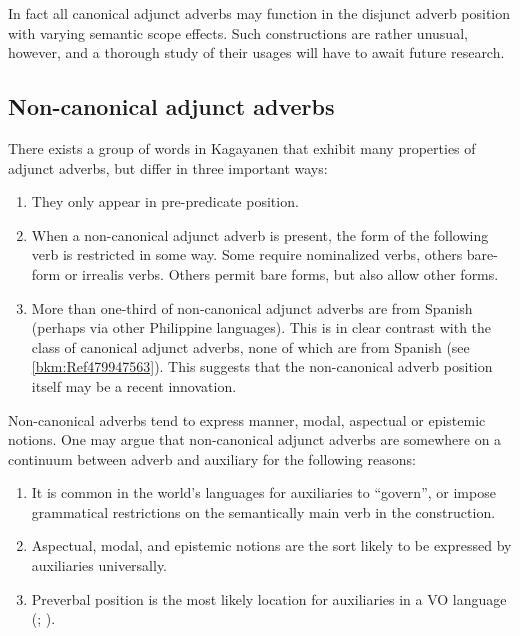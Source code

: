 In fact all canonical adjunct adverbs may function in the disjunct adverb position with varying semantic scope effects. Such constructions are rather unusual, however, and a thorough study of their usages will have to await future research.

\subsection{Non-canonical adjunct adverbs}
\label{bkm:Ref480610640} \label{sec:non-canonicaladjunctadverbs}

There exists a group of words in Kagayanen that exhibit many properties of adjunct adverbs, but differ in three important ways:

\begin{enumerate}
\item They only appear in pre-predicate position.
\item  When a non-canonical adjunct adverb is present, the form of the following verb is restricted in some way. Some require nominalized verbs, others bare-form or irrealis verbs. Others permit bare forms, but also allow other forms.
\item More than one-third of non-canonical adjunct adverbs are from Spanish (perhaps via other Philippine languages). This is in clear contrast with the class of canonical adjunct adverbs, none of which are from Spanish (see \ref{bkm:Ref479947563}). This suggests that the non-canonical adverb position itself may be a recent innovation.
\end{enumerate}

Non-canonical adverbs tend to express manner, modal, aspectual or epistemic notions. One may argue that non-canonical adjunct adverbs are somewhere on a continuum between adverb and auxiliary for the following reasons:

\begin{enumerate}
\item It is common in the world’s languages for auxiliaries to “govern”, or impose grammatical restrictions on the semantically main verb in the construction.
\item Aspectual, modal, and epistemic notions are the sort likely to be expressed by auxiliaries universally.
\item Preverbal position is the most likely location for auxiliaries in a VO language (\citealt{greenberg1963}; \citealt[90]{dryer2007}).
\end{enumerate}


